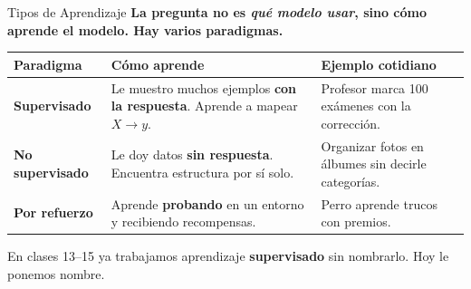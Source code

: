 \documentclass[aspectratio=169, 11pt]{beamer}
\begin{document}
\begin{frame}{Tipos de Aprendizaje}
  \vspace{-4pt}
  {\footnotesize\color{arcaDark}\bfseries
    La pregunta no es \textit{qué modelo usar}, sino \textbf{cómo
    aprende} el modelo. Hay varios paradigmas.}

  \vspace{6pt}
  {\footnotesize
  \begin{tabular}{@{}p{3cm}p{5cm}p{4.5cm}@{}}
    \toprule
    \textbf{Paradigma} & \textbf{Cómo aprende} & \textbf{Ejemplo cotidiano} \\
    \midrule
    \textbf{\color{codeBlue}Supervisado} &
      Le muestro muchos ejemplos \textbf{con la respuesta}. Aprende a mapear $X \to y$. &
      Profesor marca 100 exámenes con la corrección. \\
    \textbf{\color{codePurple}No supervisado} &
      Le doy datos \textbf{sin respuesta}. Encuentra estructura por sí solo. &
      Organizar fotos en álbumes sin decirle categorías. \\
    \textbf{\color{codeGreen}Por refuerzo} &
      Aprende \textbf{probando} en un entorno y recibiendo recompensas. &
      Perro aprende trucos con premios. \\
    \bottomrule
  \end{tabular}
  }

  \vspace{6pt}
  {\footnotesize\color{textMuted}
    \faLightbulb\hspace{4pt} En clases 13--15 ya trabajamos aprendizaje
    \textbf{supervisado} sin nombrarlo. Hoy le ponemos nombre.}
\end{frame}
\end{document}
